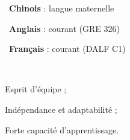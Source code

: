 \begin{textblock*}{\sideinnerw}
\begin{minipage}[t]{\sideinnerw}
\vspace{3mm}
{\centering\normalsize
\cvdotmark\ \textbf{Chinois} : langue maternelle\par\vspace{0.6mm}
\par\vspace{1mm}
\cvdotmark\ \textbf{Anglais} : courant (GRE 326)\par\vspace{0.6mm}
\par\vspace{1mm}
\cvdotmark\ \textbf{Français} : courant (DALF C1)\par\vspace{0.6mm}
\par
}

\vspace{3mm}
{\centering\textcolor{cvblue}{\LARGE\faBookOpen\ \faBasketballBall\ \faFutbol}\ \cvflower\par}

\vspace{3mm}
{\normalsize\itshape
\begin{sideitemize}
\item Esprit d'équipe ;
\item Indépendance et adaptabilité ;
\item Forte capacité d'apprentissage.
\end{sideitemize}
}
\end{minipage}
\end{textblock*}

